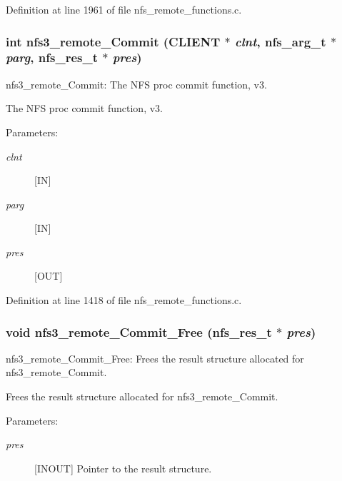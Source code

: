 Definition at line 1961 of file nfs\_\-remote\_\-functions.c.
\subsubsection[{nfs3\_\-remote\_\-Commit}]{\setlength{\rightskip}{0pt plus 5cm}int nfs3\_\-remote\_\-Commit (CLIENT $\ast$ {\em clnt}, \/  nfs\_\-arg\_\-t $\ast$ {\em parg}, \/  nfs\_\-res\_\-t $\ast$ {\em pres})}\label{group__NFSprocs_g5f699a93eee20fe5ed6ffaca441dc825}


nfs3\_\-remote\_\-Commit: The NFS proc commit function, v3.

The NFS proc commit function, v3.

\begin{Desc}
\item[Parameters:]
\begin{description}
\item[{\em clnt}][IN] \item[{\em parg}][IN] \item[{\em pres}][OUT] \end{description}
\end{Desc}


Definition at line 1418 of file nfs\_\-remote\_\-functions.c.
\subsubsection[{nfs3\_\-remote\_\-Commit\_\-Free}]{\setlength{\rightskip}{0pt plus 5cm}void nfs3\_\-remote\_\-Commit\_\-Free (nfs\_\-res\_\-t $\ast$ {\em pres})}\label{group__NFSprocs_ga842a203c0d62f114849e70e96318e0c}


nfs3\_\-remote\_\-Commit\_\-Free: Frees the result structure allocated for nfs3\_\-remote\_\-Commit.

Frees the result structure allocated for nfs3\_\-remote\_\-Commit.

\begin{Desc}
\item[Parameters:]
\begin{description}
\item[{\em pres}][INOUT] Pointer to the result structure. \end{description}
\end{Desc}


